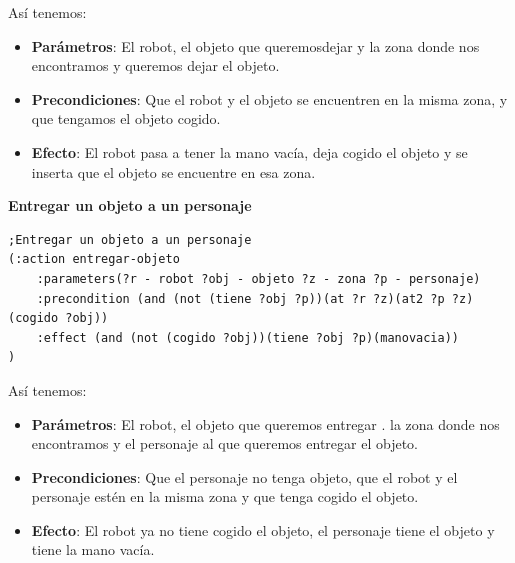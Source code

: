Así tenemos:
\begin{itemize}
	\item \textbf{Parámetros}: El robot, el objeto que queremosdejar y la zona donde nos encontramos y queremos dejar el objeto.
	\item \textbf{Precondiciones}: Que el robot y el objeto se encuentren en la misma zona, y que tengamos el objeto cogido.
	\item \textbf{Efecto}: El robot pasa a tener la mano vacía, deja cogido el objeto y se inserta que el objeto se encuentre en esa zona.\\
\end{itemize}
\textbf{Entregar un objeto a un personaje}\\
\begin{verbatim}
;Entregar un objeto a un personaje
(:action entregar-objeto
    :parameters(?r - robot ?obj - objeto ?z - zona ?p - personaje)
    :precondition (and (not (tiene ?obj ?p))(at ?r ?z)(at2 ?p ?z)(cogido ?obj))
    :effect (and (not (cogido ?obj))(tiene ?obj ?p)(manovacia))
)
\end{verbatim}
Así tenemos:
\begin{itemize}
	\item \textbf{Parámetros}: El robot, el objeto que queremos entregar . la zona donde nos encontramos y el personaje al que queremos entregar el objeto.
	\item \textbf{Precondiciones}: Que el personaje no tenga objeto, que el robot y el personaje estén en la misma zona y que tenga cogido el objeto.
	\item \textbf{Efecto}: El robot ya no tiene cogido el objeto, el personaje tiene el objeto y tiene la mano vacía.\\
\end{itemize}
